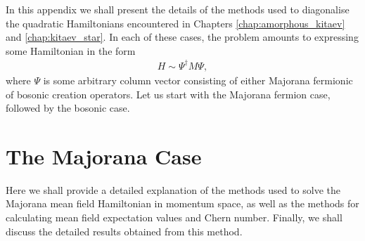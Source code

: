 \label{apx:boson_bdg}

In this appendix we shall present the details of the methods used to diagonalise the quadratic Hamiltonians encountered in Chapters \ref{chap:amorphous_kitaev} and \ref{chap:kitaev_star}. In each of these cases, the problem amounts to expressing some Hamiltonian in the form
\begin{align}
    H  \sim \Psi^\dag M \Psi,
\end{align}
where $\Psi$ is some arbitrary column vector consisting of either Majorana fermionic of bosonic creation operators. Let us start with the Majorana fermion case, followed by the bosonic case.

\section{The Majorana Case}\label{sec:majorana_diagonalisation}

Here we shall provide a detailed explanation of the methods used to solve the Majorana mean field Hamiltonian in momentum space, as well as the methods for calculating mean field expectation values and Chern number. Finally, we shall discuss the detailed results obtained from this method.

